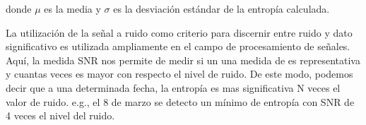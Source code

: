 donde $\mu$ es la media y $\sigma$ es la desviación estándar de la entropía calculada.  

La utilización de la señal a ruido como criterio para discernir entre ruido y dato significativo es utilizada ampliamente en el campo de procesamiento de señales.
Aquí, la medida SNR nos permite de medir si un una medida de es representativa y cuantas veces es mayor con respecto el nivel de ruido.
De este modo, podemos decir que a una determinada fecha, la entropía es mas significativa N veces el valor de ruido. e.g., el 8 de marzo se detecto un mínimo de  entropía con SNR  de 4 veces el nivel del ruido.



	

